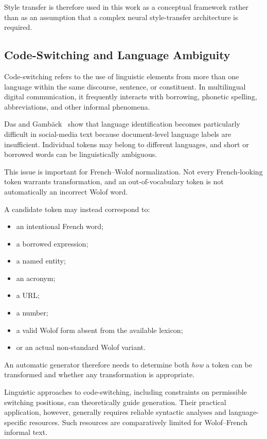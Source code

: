 \documentclass[12pt, a4paper, twoside, openany]{report}
\begin{document}
Style transfer is therefore used in this work as a conceptual framework rather than as an assumption that a complex neural style-transfer architecture is required.


\subsection{Code-Switching and Language Ambiguity}

Code-switching refers to the use of linguistic elements from more than one language within the same discourse, sentence, or constituent. In multilingual digital communication, it frequently interacts with borrowing, phonetic spelling, abbreviations, and other informal phenomena.

Das and Gamb{\"a}ck~\cite{das2013codemixing} show that language identification becomes particularly difficult in social-media text because document-level language labels are insufficient. Individual tokens may belong to different languages, and short or borrowed words can be linguistically ambiguous.

This issue is important for French--Wolof normalization. Not every French-looking token warrants transformation, and an out-of-vocabulary token is not automatically an incorrect Wolof word.

A candidate token may instead correspond to:

\begin{itemize}
	\item an intentional French word;
	\item a borrowed expression;
	\item a named entity;
	\item an acronym;
	\item a URL;
	\item a number;
	\item a valid Wolof form absent from the available lexicon;
	\item or an actual non-standard Wolof variant.
\end{itemize}

An automatic generator therefore needs to determine both \emph{how} a token can be transformed and whether any transformation is appropriate.

Linguistic approaches to code-switching, including constraints on permissible switching positions, can theoretically guide generation. Their practical application, however, generally requires reliable syntactic analyses and language-specific resources. Such resources are comparatively limited for Wolof--French informal text.
\end{document}
